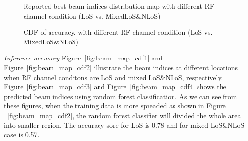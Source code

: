 \documentclass[conference, 10pt]{IEEEtran}
\begin{document}
\begin{figure}[t]
\begin{center}
{	%
	\label{fig:beam_map_cdf4}}
	\caption{Reported best beam indices distribution map \label{fig:leapperf} with different RF channel condition (LoS vs. MixedLoS\&NLoS)}
	\end{center}
	\end{figure}

\begin{figure}[t]
\begin{center}
\caption{CDF of accuracy.\label{fig:leapperf} with different RF channel condition (LoS vs. MixedLoS\&NLoS)}
\end{center}
\end{figure}
{\em Inference accuarcy} 
Figure~\ref{fig:beam_map_cdf1} and Figure~\ref{fig:beam_map_cdf2} illustrate the beam indices at different locations when RF channel conditons are LoS and mixed LoS\&NLoS, respectively. Figure~\ref{fig:beam_map_cdf3} and Figure~\ref{fig:beam_map_cdf4}
shows the predicted beam indices using random forest classification. As we can see from these figures, when the training data is more spreaded as shown in Figure ~\ref{fig:beam_map_cdf2},
the random forest classifier will divided the whole area into smaller region. The accuracy sore for LoS is 0.78 and for mixed LoS\&NLoS case is 0.57.
\end{document}
